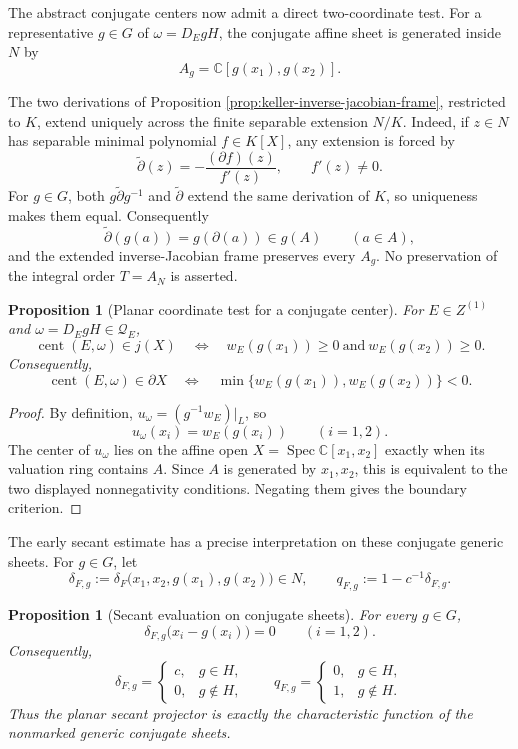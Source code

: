 \documentclass[11pt]{article}
\newtheorem{proposition}[theorem]{Proposition}
\theoremstyle{remark}
\theoremstyle{definition}
\DeclareMathOperator{\Spec}{Spec}
\newcommand{\C}{\mathbb C}
\begin{document}
The abstract conjugate centers now admit a direct two-coordinate test.
For a representative \(g\in G\) of
\(\omega=D_EgH\), the conjugate affine sheet is generated inside \(N\) by
\[
  A_g=\C[g(x_1),g(x_2)].
\]

The two derivations of Proposition
\ref{prop:keller-inverse-jacobian-frame}, restricted to \(K\), extend
uniquely across the finite separable extension \(N/K\).  Indeed, if
\(z\in N\) has separable minimal polynomial \(f\in K[X]\), any extension
is forced by
\[
  \widetilde\partial(z)
  =-\frac{(\partial f)(z)}{f'(z)},
  \qquad f'(z)\ne0.
\]
For \(g\in G\), both
\(g\widetilde\partial g^{-1}\) and \(\widetilde\partial\) extend the same
derivation of \(K\), so uniqueness makes them equal.  Consequently
\[
  \widetilde\partial(g(a))=g(\partial(a))\in g(A)
  \qquad(a\in A),
\]
and the extended inverse-Jacobian frame preserves every \(A_g\).  No
preservation of the integral order \(T=A_N\) is asserted.

\begin{proposition}[Planar coordinate test for a conjugate center]
\label{prop:planar-conjugate-coordinate-test}
For \(E\in Z^{(1)}\) and \(\omega=D_EgH\in\mathcal Q_E\),
\[
  \operatorname{cent}(E,\omega)\in j(X)
  \quad\Longleftrightarrow\quad
  w_E(g(x_1))\geq0
  \ \text{and}\
  w_E(g(x_2))\geq0.
\]
Consequently,
\[
  \operatorname{cent}(E,\omega)\in\partial X
  \quad\Longleftrightarrow\quad
  \min\{w_E(g(x_1)),w_E(g(x_2))\}<0.
\]
\end{proposition}

\begin{proof}
By definition,
\(u_\omega=(g^{-1}w_E)|_L\), so
\[
  u_\omega(x_i)=w_E(g(x_i))
  \qquad(i=1,2).
\]
The center of \(u_\omega\) lies on the affine open
\(X=\Spec\C[x_1,x_2]\) exactly when its valuation ring contains
\(A\).  Since \(A\) is generated by \(x_1,x_2\), this is equivalent to
the two displayed nonnegativity conditions.  Negating them gives the
boundary criterion.
\end{proof}

The early secant estimate has a precise interpretation on these conjugate
generic sheets.  For \(g\in G\), let
\[
  \delta_{F,g}
  :=
  \delta_F\bigl(x_1,x_2,g(x_1),g(x_2)\bigr)\in N,
  \qquad
  q_{F,g}:=1-c^{-1}\delta_{F,g}.
\]

\begin{proposition}[Secant evaluation on conjugate sheets]
\label{prop:secant-conjugate-evaluation}
For every \(g\in G\),
\[
  \delta_{F,g}\bigl(x_i-g(x_i)\bigr)=0
  \qquad(i=1,2).
\]
Consequently,
\[
  \delta_{F,g}
  =
  \begin{cases}
    c,&g\in H,\\
    0,&g\notin H,
  \end{cases}
  \qquad
  q_{F,g}
  =
  \begin{cases}
    0,&g\in H,\\
    1,&g\notin H.
  \end{cases}
\]
Thus the planar secant projector is exactly the characteristic function of
the nonmarked generic conjugate sheets.
\end{proposition}
\end{document}
